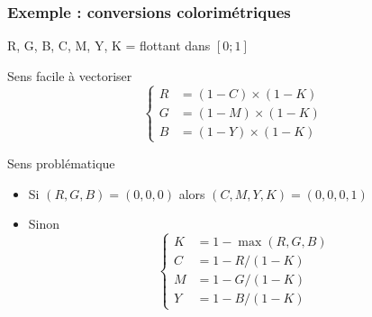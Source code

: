 \documentclass[xcolor={x11names,svgnames}]{beamer}
\begin{document}

\begin{frame}[fragile=singleslide]
  \frametitle{Exemple : conversions colorimétriques}

  R, G, B, C, M, Y, K = flottant dans $[0; 1]$

  \begin{exampleblock}{Sens facile à vectoriser}
  \[
  \left\{
    \begin{array}{rl}
      R &= (1-C) \times (1 - K) \\
      G &= (1-M) \times (1 - K) \\
      B &= (1-Y) \times (1 - K)
    \end{array}
    \right.
\]
\end{exampleblock}

\begin{alertblock}{Sens problématique}
  \begin{itemize}
  \item Si $(R, G, B) = (0, 0, 0)$ alors $(C,M,Y,K) = (0, 0, 0, 1)$
    
  \item Sinon
    \[  \left\{\begin{array}{rl}
      K &= 1 - \max(R, G, B) \\
      C &= 1 - R  / (1 - K) \\
      M &= 1 - G  / (1 - K) \\
      Y &= 1 - B  / (1 - K) 
    \end{array}
    \right.
\]
\end{itemize}


\end{alertblock}
\end{frame}

\end{document}
